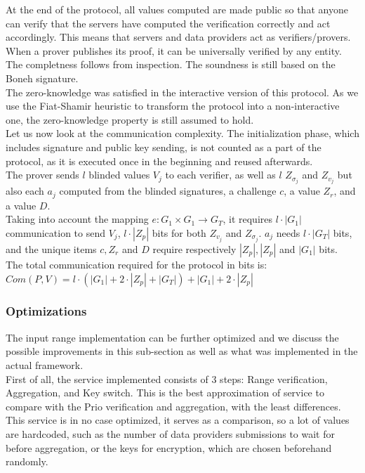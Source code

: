 \documentclass{article}
\begin{document}
At the end of the protocol, all values computed are made public so that anyone can verify that the servers have computed the verification correctly and act accordingly. This means that servers and data providers act as verifiers/provers. When a prover publishes its proof, it can be universally verified by any entity.\\

The completness follows from inspection. The soundness is still based on the Boneh signature.\\
The zero-knowledge was satisfied in the interactive version of this protocol. As we use the Fiat-Shamir heuristic \cite{fiatshamir} to transform the protocol into a  non-interactive one, the zero-knowledge property is still assumed to hold.\\

Let us now look at the communication complexity.
The initialization phase, which includes signature and public key sending, is not counted as a part of the protocol, as it is executed once in the beginning and reused afterwards.\\
The prover sends $l$ blinded values $V_j$ to each verifier, as well as $l$ $Z_{\sigma_j}$ and $Z_{v_j}$ but also each $a_j$ computed from the blinded signatures, a challenge $c$, a value $Z_r$, and a value $D$.\\
Taking into account the mapping $e : G_1 \times G_1 \rightarrow G_T$, it requires $l \cdot |G_1|$ communication to send $V_j$, $l \cdot |Z_p|$ bits for both $Z_{v_j}$ and $Z_{\sigma_j}$. $a_j$  needs $l \cdot |G_T|$ bits, and the unique items $c,Z_r $ and $D$ require respectively $ |Z_p|, |Z_p| $ and $|G_1|$ bits.\\
The total communication required for the protocol in bits is:\\
$Com(P,V) = l \cdot (|G_1| + 2 \cdot |Z_p| + |G_T|) + |G_1| + 2 \cdot |Z_p|$


\subsubsection*{Optimizations}
The input range implementation can be further optimized and we discuss the possible improvements in this sub-section as well as what was implemented in the actual framework.\\
First of all, the service implemented consists of 3 steps: Range verification, Aggregation, and Key switch. This is the best approximation of service to compare with the Prio verification and aggregation, with the least differences.\\
This service is in no case optimized, it serves as a comparison, so a lot of values are hardcoded, such as the number of data providers submissions to wait for before aggregation, or the keys for encryption, which are chosen beforehand randomly.\\
\end{document}
